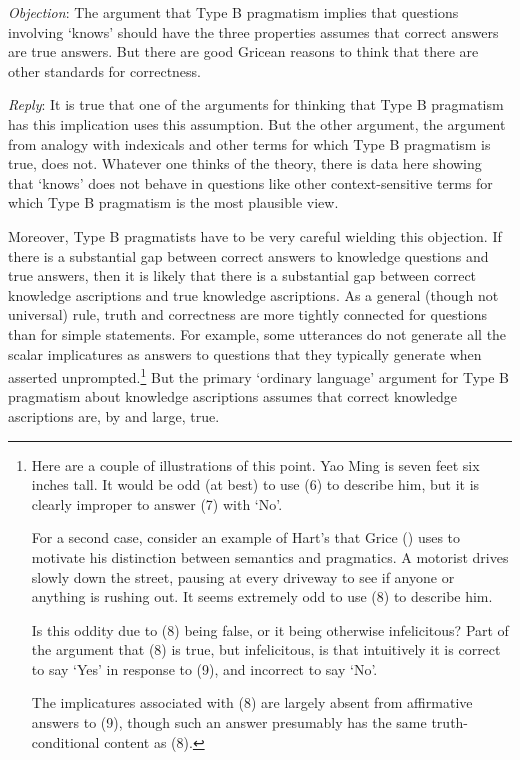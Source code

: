 \documentclass[
  10pt,
  letterpaper,
  DIV=11,
  numbers=noendperiod,
  twoside]{scrartcl}
\begin{document}
\emph{Objection}: The argument that Type B pragmatism implies that
questions involving `knows' should have the three properties assumes
that correct answers are true answers. But there are good Gricean
reasons to think that there are other standards for correctness.

\emph{Reply}: It is true that one of the arguments for thinking that
Type B pragmatism has this implication uses this assumption. But the
other argument, the argument from analogy with indexicals and other
terms for which Type B pragmatism is true, does not. Whatever one thinks
of the theory, there is data here showing that `knows' does not behave
in questions like other context-sensitive terms for which Type B
pragmatism is the most plausible view.

Moreover, Type B pragmatists have to be very careful wielding this
objection. If there is a substantial gap between correct answers to
knowledge questions and true answers, then it is likely that there is a
substantial gap between correct knowledge ascriptions and true knowledge
ascriptions. As a general (though not universal) rule, truth and
correctness are more tightly connected for questions than for simple
statements. For example, some utterances do not generate all the scalar
implicatures as answers to questions that they typically generate when
asserted unprompted.\footnote{Here are a couple of illustrations of this
  point. Yao Ming is seven feet six inches tall. It would be odd (at
  best) to use (6) to describe him, but it is clearly improper to answer
  (7) with `No'.

  For a second case, consider an example of Hart's that Grice
  () uses to motivate his distinction
  between semantics and pragmatics. A motorist drives slowly down the
  street, pausing at every driveway to see if anyone or anything is
  rushing out. It seems extremely odd to use (8) to describe him.

  Is this oddity due to (8) being false, or it being otherwise
  infelicitous? Part of the argument that (8) is true, but infelicitous,
  is that intuitively it is correct to say `Yes' in response to (9), and
  incorrect to say `No'.

  The implicatures associated with (8) are largely absent from
  affirmative answers to (9), though such an answer presumably has the
  same truth-conditional content as (8).} But the primary `ordinary
language' argument for Type B pragmatism about knowledge ascriptions
assumes that correct knowledge ascriptions are, by and large, true.
\end{document}
